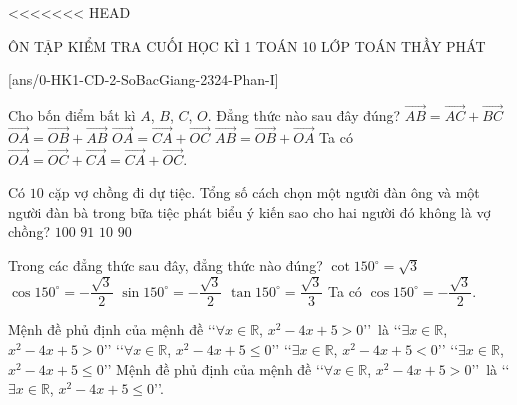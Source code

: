 <<<<<<< HEAD
\setcounter{deso}{2}
\begin{name}
	{ÔN TẬP KIỂM TRA CUỐI HỌC KÌ 1}
	{TOÁN 10}
	{LỚP TOÁN THẦY PHÁT}
	{\thoigian}
\end{name}
\caulc
{}[ans/0-HK1-CD-2-SoBacGiang-2324-Phan-I]
\begin{ex}%
	Cho bốn điểm bất kì $A$, $B$, $C$, $O$. Đẳng thức nào sau đây đúng?
	\choice
	{$\overrightarrow{AB}=\overrightarrow{AC}+\overrightarrow{BC}$}
	{$\overrightarrow{OA}=\overrightarrow{OB}+\overrightarrow{AB}$}
	{\True $\overrightarrow{OA}=\overrightarrow{CA}+\overrightarrow{OC}$}
	{$\overrightarrow{AB}=\overrightarrow{OB}+\overrightarrow{OA}$}
	\loigiai
	{
		Ta có $\overrightarrow{OA}=\overrightarrow{OC}+\overrightarrow{CA}=\overrightarrow{CA}+\overrightarrow{OC}$.
	}
\end{ex}

\begin{ex}%
Có $10$ cặp vợ chồng đi dự tiệc. Tổng số cách chọn một người đàn ông và một người đàn bà trong bữa tiệc phát biểu ý kiến sao cho hai người đó không là vợ chồng?
\choice
{$100$}
{$91$}
{$10$}
{\True $90$}
\end{ex}

\begin{ex}%
	Trong các đẳng thức sau đây, đẳng thức nào đúng?
	\choice
	{$\cot 150^\circ=\sqrt 3$}
	{\True $\cos 150^\circ=-\dfrac{\sqrt 3}{2}$}
	{$\sin 150^\circ=-\dfrac{\sqrt 3}{2}$}
	{$\tan 150^\circ=\dfrac{\sqrt 3}{3}$}
	\loigiai
	{
		Ta có $\cos 150^\circ=-\dfrac{\sqrt 3}{2}$.
	}
\end{ex}

\begin{ex}%
	Mệnh đề phủ định của mệnh đề \lq\lq $\forall x\in\mathbb{R}$, $x^2-4x+5>0$\rq\rq\ là
	\choice
	{\lq\lq $\exists x\in\mathbb{R}$, $x^2-4x+5>0$\rq\rq}
	{\lq\lq $\forall x\in\mathbb{R}$, $x^2-4x+5\leq 0$\rq\rq}
	{\lq\lq $\exists x\in\mathbb{R}$, $x^2-4x+5<0$\rq\rq}
	{\True \lq\lq $\exists x\in\mathbb{R}$, $x^2-4x+5\leq 0$\rq\rq}
	\loigiai
	{
		Mệnh đề phủ định của mệnh đề \lq\lq $\forall x\in\mathbb{R}$, $x^2-4x+5>0$\rq\rq\ là \lq\lq $\exists x\in\mathbb{R}$, $x^2-4x+5\leq 0$\rq\rq.
	}
\end{ex}

